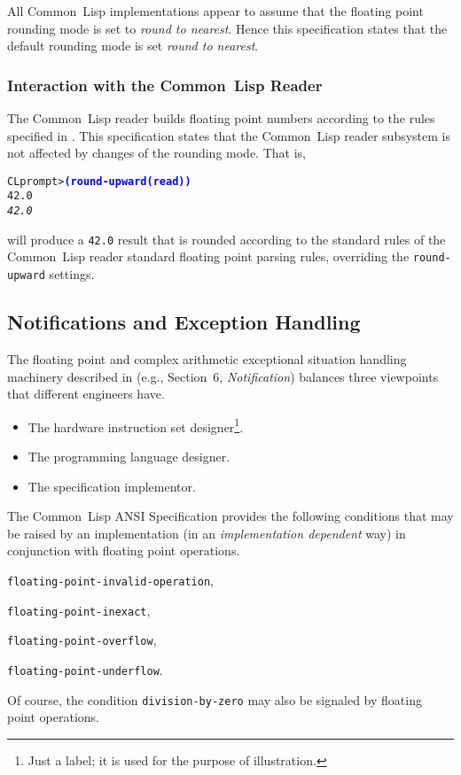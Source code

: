 \documentclass[10pt,fleqn]{article}
\newcommand{\CL}{\textsf{Common~Lisp}}
\newcommand{\code}[1]{\texttt{#1}}
\newcommand{\codeprompt}[1]{\textcolor{blue}{\textbf{#1}}}
\begin{document}
All \CL{} implementations appear to assume that the floating point
rounding mode is set to \emph{round to nearest}.  Hence this
specification states that the default rounding mode is set \emph{round
  to nearest}.

\subsubsection{Interaction with the \CL{} Reader}

The \CL{} reader builds floating point numbers according to the rules
specified in \cite{1994:ANSICL}.  This specification states that the
\CL{} reader subsystem is not affected by changes of the rounding
mode.  That is,
\begin{alltt}
CL prompt> \codeprompt{(round-upward (read))}
42.0
\textit{42.0}
\end{alltt}
will produce a \code{42.0} result that is rounded according to the
standard rules of the \CL{} reader standard floating point parsing
rules, overriding the \code{round-upward} settings.



\subsection{Notifications and Exception Handling}
\label{sect:notifications}

The floating point and complex arithmetic exceptional situation
handling machinery described in
\cite{2012:LIA1,2001:LIA2,2004:LIA3,2008:IEEE-754} (e.g.,
\cite{2001:LIA2} Section~6, \emph{Notification}) balances three
viewpoints that different engineers have.

\begin{itemize}
\item The hardware instruction set designer\footnote{Just a label; it
    is used for the purpose of illustration.}.
\item The programming language designer.
\item The specification implementor.
\end{itemize}

The \CL{} ANSI Specification provides the following conditions that
may be raised by an implementation (in an \emph{implementation
  dependent} way) in conjunction with floating point operations.
\begin{description}
\item \code{floating-point-invalid-operation},
\item \code{floating-point-inexact},
\item \code{floating-point-overflow},
\item \code{floating-point-underflow}.
\end{description}
Of course, the condition \code{division-by-zero} may also be signaled
by floating point operations.
\end{document}
